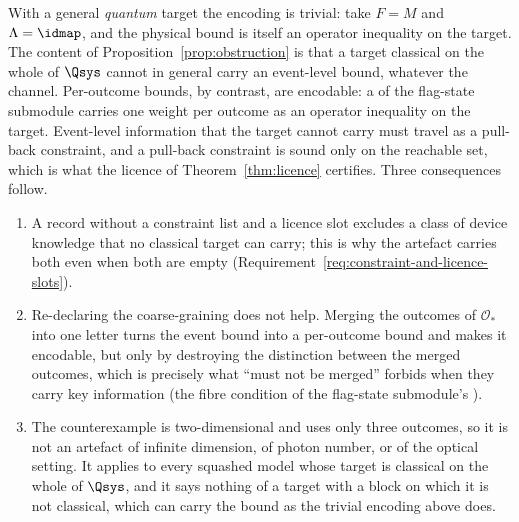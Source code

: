 
\begin{remark}
\label{rem:obstruction-scope}
With a general \emph{quantum} target the encoding is trivial: take $F=M$ and
$\Lambda=\idmap$, and the physical bound is itself an operator inequality on
the target. The content of Proposition~\ref{prop:obstruction} is that a
target classical on the whole of $\Qsys$ cannot in general carry an
event-level bound, whatever the channel.
Per-outcome bounds, by contrast, are encodable: a
 of the flag-state submodule carries one weight per outcome
as an operator inequality on the target. Event-level information that the
target cannot carry must travel as a pull-back constraint, and a pull-back constraint is
sound only on the reachable set, which is what the licence of
Theorem~\ref{thm:licence} certifies. Three consequences follow.
\begin{enumerate}[label=(\alph*),leftmargin=2.4em]
\item A record without a constraint list and a licence slot excludes a class
  of device knowledge that no classical target can carry; this is why the
  artefact carries both even when both are empty
  (Requirement~\ref{req:constraint-and-licence-slots}).
\item Re-declaring the coarse-graining does not help. Merging the outcomes of
  $\mathcal{O}_{*}$ into one letter turns the event bound into a per-outcome
  bound and makes it encodable, but only by destroying the distinction
  between the merged outcomes, which is precisely what ``must not be merged''
  forbids when they carry key information (the fibre condition of the
  flag-state submodule's ).
\item The counterexample is two-dimensional and uses only three outcomes, so it
  is not an artefact of infinite dimension, of photon number, or of the optical
  setting. It applies to every squashed model whose target is classical on
  the whole of $\Qsys$, and it says nothing of a target with a block on which
  it is not classical, which can carry the bound as the trivial encoding
  above does.
\end{enumerate}
\end{remark}
